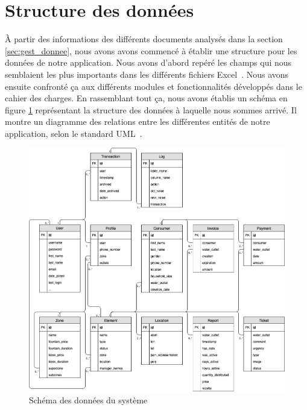\documentclass{EPL-master-thesis-covers-FR}
\begin{document}
		\section{Structure des données}

			À partir des informations des différents documents analysés dans la section \ref{sec:gest_donnee}, nous avons avons commencé à établir une structure pour les données de notre application. Nous avons d'abord repéré les champs qui nous semblaient les plus importants dans les différents fichiers Excel~\cite{ref:resumes_documents}. Nous avons ensuite confronté ça aux différents modules et fonctionnalités développés dans le cahier des charges. En rassemblant tout ça, nous avons établis un schéma en figure \ref{fig:db} représentant la structure des données à laquelle nous sommes arrivé. Il montre un diagramme des relations entre les différentes entités de notre application, selon le standard UML~\cite{ref:siegfried_db}.

			\begin{figure}
				\centering
				\includegraphics[width=\textwidth]{images/db}
				\caption{Schéma des données du système}
				\label{fig:db}
			\end{figure}

\end{document}
